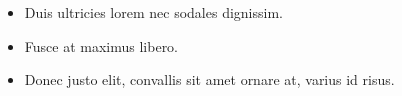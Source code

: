 
\begin{itemize}
  \item Duis ultricies lorem nec sodales dignissim.
  \item Fusce at maximus libero.
  \item Donec justo elit, convallis sit amet ornare at, varius id risus.
\end{itemize}